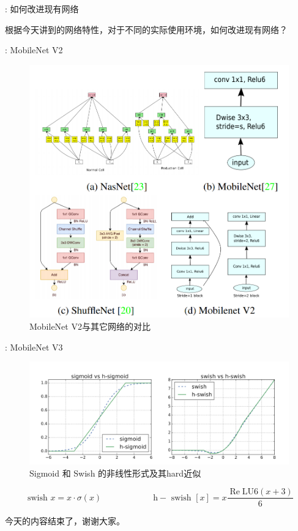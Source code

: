 \documentclass[UTF8, fontset=founder, aspectratio=43, 10pt, t]{ctexbeamer}
\begin{document}
\begin{frame}{\titleprefix: 如何改进现有网络}
	
	根据今天讲到的网络特性，对于不同的实际使用环境，如何改进现有网络？
	
\end{frame}

\begin{frame}{\titleprefix: MobileNet V2}
	\begin{figure}
		\centering
		\includegraphics[width=0.6\linewidth]{Images/mobilenetv2}
		\caption{MobileNet V2与其它网络的对比}
		\label{fig:mobilenetv2}
	\end{figure}
	
\end{frame}

\begin{frame}{\titleprefix: MobileNet V3}
	\begin{figure}
		\centering
		\includegraphics[width=0.9\linewidth]{Images/mobilenetv3}
		\caption{Sigmoid 和 Swish 的非线性形式及其hard近似}
		\label{fig:mobilenetv3}
	\end{figure}
	\[\text { swish } x=x \cdot \sigma(x)
	\hspace{1in}
	\mathrm{h}-\text { swish }[x]=x
	\frac{\operatorname{Re} \mathrm{L} \mathrm{U} 6(x+3)}{6}\]
\end{frame}

\begin{frame}
	今天的内容结束了，谢谢大家。
\end{frame}
\end{document}

